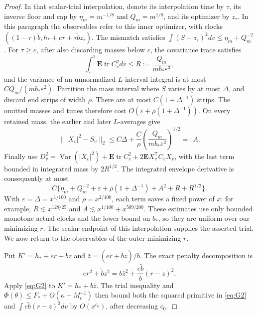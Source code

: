\begin{proof}
In that scalar-trial interpolation, denote its interpolation time by
\(\tau\), its inverse floor and cap by \(\eta_m=m^{-1/8}\) and
\(Q_m=m^{1/8}\), and its optimizer by \(z_\tau\). In this paragraph
the observables refer to this inner optimizer, with clocks
\(((1-\tau)\widetilde b,h_*+er+\tau\widetilde b z_\tau)\).
The mismatch
satisfies \(\int(S-z_\tau)^2dv\le\eta_m+Q_m^{-2}\). For
\(\tau\ge\varepsilon\), after also discarding masses below
\(\varepsilon\), the covariance trace satisfies
\[
 \int_\varepsilon^1\mathbf E\operatorname{tr}C_v^2dv
       \le R:=\frac{Q_m}{m b_*\varepsilon^3},
\]
and the variance of an unnormalized \(L\)-interval integral is at
most \(C Q_m/(m b_*\varepsilon^2)\). Partition the mass interval
where \(S\) varies by at most \(\Delta\), and discard end strips
of width \(\rho\). There are at most \(C(1+\Delta^{-1})\) strips.
The omitted masses and times therefore cost
\(O(\varepsilon+\rho(1+\Delta^{-1}))\). On every retained mass,
the earlier and later \(L\)-averages give
\[
 \bigl\||X_v|^2-S_v\bigr\|_2
 \le C\Delta+\frac C\rho
       \left(\frac{Q_m}{m b_*\varepsilon^2}\right)^{1/2}=:A.
\]
Finally use
\(D_v^2=\operatorname{Var}(|X_v|^2)+\mathbf E\operatorname{tr}C_v^2
+2\mathbf E X_v^{\mathsf T}C_vX_v\), with the last term bounded
in integrated mass by \(2R^{1/2}\). The integrated envelope derivative
is consequently at most
\[
 C\{\eta_m+Q_m^{-2}+\varepsilon+\rho(1+\Delta^{-1})
                   +A^2+R+R^{1/2}\}.
\]
With \(\varepsilon=\Delta=x^{1/100}\) and \(\rho=x^{2/100}\),
each term saves a fixed power of \(x\): for example,
\(R\lesssim x^{128/25}\) and
\(A\lesssim x^{1/100}+x^{509/200}\).
These estimates use only bounded monotone actual clocks and the lower
bound on \(b_*\), so they are uniform over our minimizing \(r\).
The scalar endpoint of this interpolation supplies the asserted trial.
We now return to the observables of the outer minimizing \(r\).

Put \(K'=h_*+er+\widetilde b z\) and
\(\bar z=(er+\widetilde b z)/b\). The exact penalty decomposition is
\[
 er^2+\widetilde b z^2
       =b\bar z^2+\frac{e\widetilde b}{b}(r-z)^2.
\]
Apply \eqref{eq:G2} to \(K'=h_*+b\bar z\). The trial inequality and
\(\Phi(\theta)\le F_*+O(\kappa+M_c^{-1})\) then bound both
the squared primitive in \eqref{eq:G2} and
\(\int e\widetilde b(r-z)^2dv\) by \(O(x^{c_0})\), after
decreasing \(c_0\).


\end{proof}
